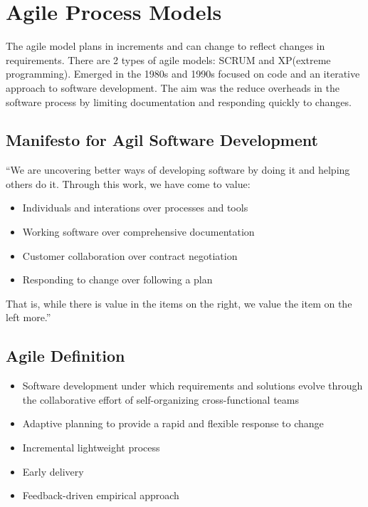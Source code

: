 \documentclass{article}
\begin{document}
    \section*{Agile Process Models}

    The agile model plans in increments and can change to reflect changes in requirements.
    There are 2 types of agile models: SCRUM and XP(extreme programming). Emerged in the 
    1980s and 1990s focused on code and an iterative approach to software development.
    The aim was the reduce overheads in the software process by limiting documentation 
    and responding quickly to changes.

    \subsection*{Manifesto for Agil Software Development}

    “We are uncovering better ways of developing software by doing it and helping others 
    do it. Through this work, we have come to value:

    \begin{itemize}
        \item Individuals and interations over processes and tools
        \item Working software over comprehensive documentation
        \item Customer collaboration over contract negotiation
        \item Responding to change over following a plan
    \end{itemize}

    That is, while there is value in the items on the right, we value the item on the left 
    more.”

    \subsection*{Agile Definition}

    \begin{itemize}
        \item Software development under which requirements and solutions evolve through 
        the collaborative effort of self-organizing cross-functional teams
        \item
        Adaptive planning to provide a rapid and flexible response to change
        \item
        Incremental lightweight process
        \item
        Early delivery
        \item
        Feedback-driven empirical approach
    \end{itemize}
\end{document}
